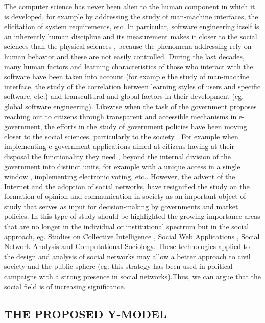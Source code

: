 \documentclass[10pt,twocolumn,ieeetran]{article}
\begin{document}
The computer science has never been alien to the human component in which it is developed, for example by addressing the study of man-machine interfaces, the elicitation of system requirements, etc. In particular, software engineering itself is an inherently human discipline and its measurement makes it closer to the social sciences than the physical sciences \cite{Morasca},  because the phenomena addressing rely on human behavior and these are not easily controlled.
During the last decades,  many human factors and learning characteristics of those who interact with the software have been taken into account (for example the study of man-machine interface, the study of the correlation between learning styles of users and specific software, etc.) and transcultural and global factors in their development (eg. global software engineering).
Likewise when the task of the government proposes reaching  out to citizens through transparent and accessible mechanisms in e-government,  the efforts in the study of government policies have been moving closer to the social sciences, particularly to the society \cite{Graham}.
For example when implementing e-government applications aimed at citizens having at their disposal the functionality they need \cite{Fountain}, beyond the internal division of the government into distinct units, for example with a unique access in a single window \cite{OECD}, implementing electronic voting, etc.. However, the advent of the Internet and the adoption of social networks, have resignified the study on the formation of opinion and communication in society as an important object of study that serves as input for decision-making by governments and market policies.
In this type of study should be highlighted the growing importance areas that are no longer in the individual or institutional spectrum but in the social approach, eg. Studies on Collective Intelligence \cite{Seragan}, Social Web Applications \cite{Bell}, Social Network Analysis \cite{Tsvetovat} and Computational Sociology. These technologies applied to the design and analysis of social networks may allow a better approach to civil society and the public sphere (eg. this strategy has been used in political campaigns with a strong presence in social networks).Thus, we can argue that the social field is of increasing significance.

\subsection{THE PROPOSED Y-MODEL}
\end{document}
